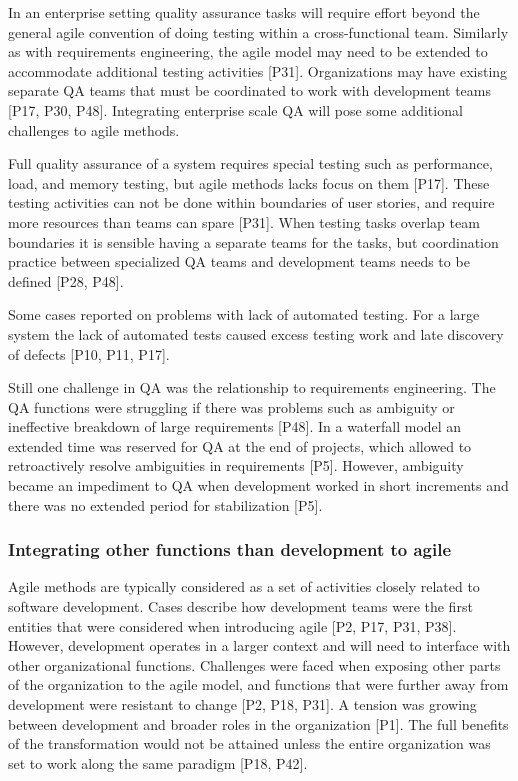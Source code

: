 In an enterprise setting quality assurance tasks will require effort beyond the
general agile convention of doing testing within a cross-functional team.
Similarly as with requirements engineering, the agile model may need to be
extended to accommodate additional testing activities [P31]. Organizations may
have existing separate QA teams that must be coordinated to work with
development teams [P17, P30, P48]. Integrating enterprise scale QA will pose
some additional challenges to agile methods.

Full quality assurance of a system requires special testing such as performance,
load, and memory testing, but agile methods lacks focus on them [P17]. These
testing activities can not be done within boundaries of user stories, and
require more resources than teams can spare [P31]. When testing tasks overlap
team boundaries it is sensible having a separate teams for the tasks, but
coordination practice between specialized QA teams and development teams needs
to be defined [P28, P48].

Some cases reported on problems with lack of automated testing. For a large
system the lack of automated tests caused excess testing work and late discovery
of defects [P10, P11, P17].

Still one challenge in QA was the relationship to requirements engineering. The
QA functions were struggling if there was problems such as ambiguity or
ineffective breakdown of large requirements [P48]. In a waterfall model an
extended time was reserved for QA at the end of projects, which allowed to
retroactively resolve ambiguities in requirements [P5]. However, ambiguity
became an impediment to QA when development worked in short increments and
there was no extended period for stabilization [P5].


\subsubsection{Integrating other functions than development to agile}

Agile methods are typically considered as a set of activities closely related to
software development. Cases describe how development teams were the first
entities that were considered when introducing agile [P2, P17, P31, P38].
However, development operates in a larger context and will need to interface
with other organizational functions.
Challenges were faced when exposing other parts of the organization to the agile
model, and functions that were further away from development were resistant to
change [P2, P18, P31]. A tension was growing between development and broader
roles in the organization [P1]. The full benefits of the transformation would
not be attained unless the entire organization was set to work along the same
paradigm [P18, P42].

